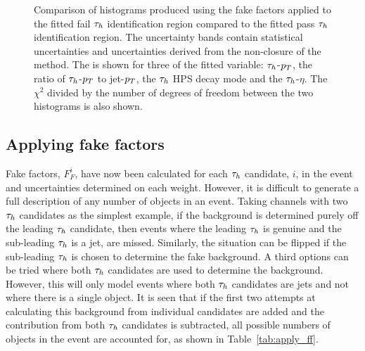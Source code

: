 \begin{figure}[!hbtp]
\caption{Comparison of histograms produced using the fake factors applied to the fitted fail $\tau_{h}$ identification region compared to the fitted pass $\tau_{h}$ identification region. The uncertainty bands contain statistical uncertainties and uncertainties derived from the non-closure of the method. The is shown for three of the fitted variable: $\tau_{h}$-$p_{T}$, the ratio of $\tau_{h}$-$p_{T}$ to jet-$p_{T}$, the $\tau_{h}$ HPS decay mode and the $\tau_{h}$-$\eta$. The $\chi^2$ divided by the number of degrees of freedom between the two histograms is also shown.}
\label{fig:4tau_ff_closure}
\end{figure}

\subsection{Applying fake factors}

Fake factors, $F_{F}^{i}$, have now been calculated for each $\tau_{h}$ candidate, $i$, in the event and uncertainties determined on each weight. 
However, it is difficult to generate a full description of any number of \jtth objects in an event.
Taking channels with two $\tau_{h}$ candidates as the simplest example, if the \jtth background is determined purely off the leading $\tau_{h}$ candidate, then events where the leading $\tau_{h}$ is genuine and the sub-leading $\tau_{h}$ is a jet, are missed.
Similarly, the situation can be flipped if the sub-leading $\tau_{h}$ is chosen to determine the \jtth fake background.
A third options can be tried where both $\tau_{h}$ candidates are used to determine the background.
However, this will only model events where both $\tau_{h}$ candidates are jets and not where there is a single \jtth object. 
It is seen that if the first two attempts at calculating this background from individual candidates are added and the contribution from both $\tau_{h}$ candidates is subtracted, all possible numbers of \jtth objects in the event are accounted for, as shown in Table~\ref{tab:apply_ff}. \\

